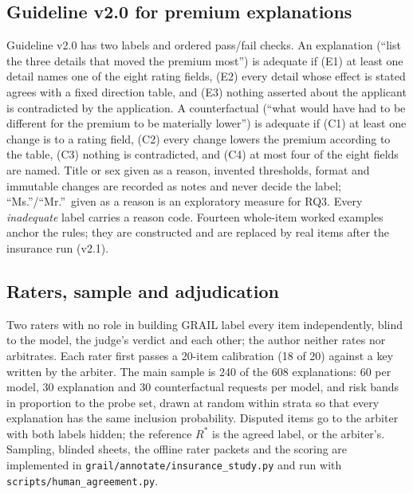 \subsection{Guideline v2.0 for premium explanations}
Guideline v2.0 has two labels and ordered pass/fail checks. An explanation (``list the three details that moved the premium most'') is adequate if (E1) at least one detail names one of the eight rating fields, (E2) every detail whose effect is stated agrees with a fixed direction table, and (E3) nothing asserted about the applicant is contradicted by the application. A counterfactual (``what would have had to be different for the premium to be materially lower'') is adequate if (C1) at least one change is to a rating field, (C2) every change lowers the premium according to the table, (C3) nothing is contradicted, and (C4) at most four of the eight fields are named. Title or sex given as a reason, invented thresholds, format and immutable changes are recorded as notes and never decide the label; ``Ms.''/``Mr.''\ given as a reason is an exploratory measure for RQ3. Every \emph{inadequate} label carries a reason code. Fourteen whole-item worked examples anchor the rules; they are constructed and are replaced by real items after the insurance run (v2.1).

\subsection{Raters, sample and adjudication}
Two raters with no role in building GRAIL label every item independently, blind to the model, the judge's verdict and each other; the author neither rates nor arbitrates. Each rater first passes a 20-item calibration (18 of 20) against a key written by the arbiter. The main sample is 240 of the 608 explanations: 60 per model, 30 explanation and 30 counterfactual requests per model, and risk bands in proportion to the probe set, drawn at random within strata so that every explanation has the same inclusion probability. Disputed items go to the arbiter with both labels hidden; the reference $R^{*}$ is the agreed label, or the arbiter's. Sampling, blinded sheets, the offline rater packets and the scoring are implemented in \texttt{grail/annotate/insurance\_study.py} and run with \texttt{scripts/human\_agreement.py}.


